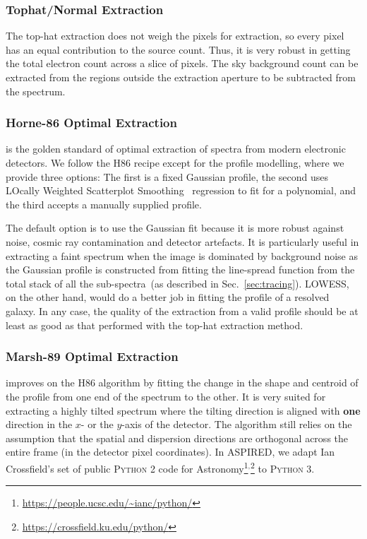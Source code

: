 \documentclass[twocolumn, linenumbers]{aastex631}
\begin{document}
\subsubsection*{Tophat/Normal Extraction}
\label{sec:tophat}
The top-hat extraction does not weigh the pixels for extraction,
so every pixel has an equal contribution to the source count. Thus,
it is very robust in getting the total electron count across
a slice of pixels. The sky background count can be extracted
from the regions outside the extraction aperture to be
subtracted from the spectrum.

\subsubsection*{Horne-86 Optimal Extraction}
\citet[hereafter H86]{1986PASP...98..609H} is the golden standard
of optimal extraction of spectra from modern electronic detectors.
We follow the H86 recipe except for the profile modelling,
where we provide three options: The first is a fixed Gaussian
profile, the second uses LOcally Weighted Scatterplot
Smoothing~\citep[LOWESS]{doi:10.1080/01621459.1979.10481038}
regression to fit for a polynomial, and the third accepts
a manually supplied profile.

The default option is to use the Gaussian fit because it is
more robust against noise, cosmic ray contamination and detector
artefacts. It is particularly useful in extracting a faint
spectrum when the image is dominated by background noise as the
Gaussian profile is constructed from fitting the line-spread
function from the total stack of all the
sub-spectra~(as described in Sec.~\ref{sec:tracing}).
LOWESS, on the other hand, would do a better job in fitting
the profile of a resolved galaxy. In any case, the quality
of the extraction from a valid profile should be at least as
good as that performed with the top-hat extraction method.

\subsubsection*{Marsh-89 Optimal Extraction}
\citet[hereafter M89]{1989PASP..101.1032M} improves on the H86 algorithm by
fitting the change in the shape and centroid of the profile from one end of the
spectrum to the other. It is very suited for extracting a highly tilted
spectrum where the tilting direction is aligned with \textbf{one} direction in
the $x$- or the $y$-axis of the detector. The algorithm still relies on the
assumption that the spatial and dispersion directions are orthogonal across
the entire frame (in the detector pixel coordinates). In \textsc{ASPIRED}, we
adapt Ian Crossfield's set of public \textsc{Python 2} code for
Astronomy\footnote{\url{https://people.ucsc.edu/~ianc/python/}}$^,$\footnote{\url{https://crossfield.ku.edu/python/}}
to \textsc{Python 3}.
\end{document}
